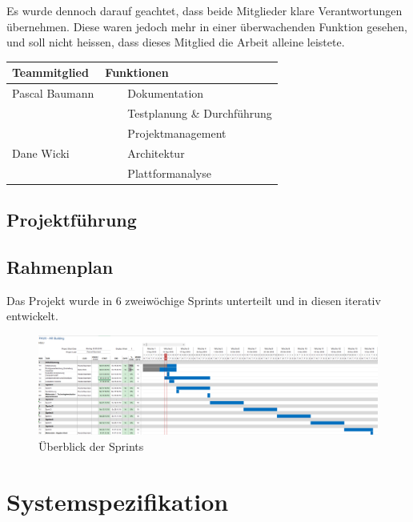 \documentclass[a4paper]{scrreprt}
\newcommand{\tabitem}{~~\llap{\textbullet}~~}
\begin{document}
Es wurde dennoch darauf geachtet, dass beide Mitglieder klare Verantwortungen übernehmen. Diese waren jedoch mehr in einer überwachenden Funktion gesehen, und soll nicht heissen, dass dieses Mitglied die Arbeit alleine leistete.

\vspace{1em}

\begin{tabularx}{\textwidth}{|X|X|}
	\hline
	\textbf{Teammitglied} & \textbf{Funktionen} \\
	\hline
	Pascal Baumann & \tabitem Dokumentation \\
	& \tabitem Testplanung \& Durchführung \\
	& \tabitem Projektmanagement \\
	\hline
	Dane Wicki & \tabitem Architektur \\
	& \tabitem Plattformanalyse \\
	\hline
\end{tabularx}

\subsection{Projektführung}

\subsection{Rahmenplan}

Das Projekt wurde in 6 zweiwöchige Sprints unterteilt und in diesen iterativ entwickelt.

\vspace{1em}

\begin{figure}
	\includegraphics[keepaspectratio, width=\textwidth]{Rahmenplan}
	\caption{Überblick der Sprints}
\end{figure}

\section{Systemspezifikation}
\end{document}
